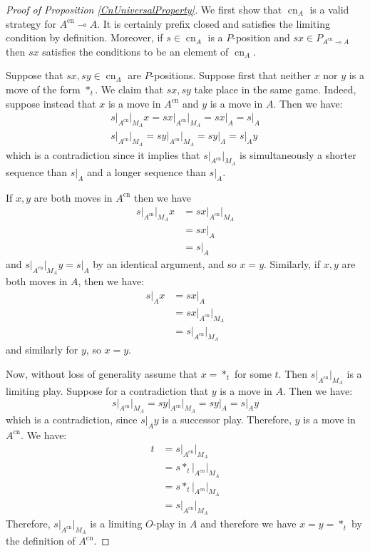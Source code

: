 \documentclass[11pt]{article} %
\theoremstyle{plain} %
\theoremstyle{definition} %
\theoremstyle{note}
\theoremstyle{exercisestyle}
\renewcommand{\implies}{\multimap}
\DeclareMathOperator{\cn}{cn}
\begin{document}
\begin{proof}[Proof of Proposition \ref{CnUniversalProperty}]
  We first show that $\cn_A$ is a valid strategy for $A^{\cn}\implies A$.  It is certainly prefix closed and satisfies the limiting condition by definition.  Moreover, if $s\in\cn_A$ is a $P$-position and $sx\in P_{A^{\cn}\implies A}$ then $sx$ satisfies the conditions to be an element of $\cn_A$.

  Suppose that $sx, sy\in \cn_A$ are $P$-positions.  Suppose first that neither $x$ nor $y$ is a move of the form $*_t$.  We claim that $sx,sy$ take place in the same game.  Indeed, suppose instead that $x$ is a move in $A^{\cn}$ and $y$ is a move in $A$.  Then we have:
  \begin{gather*}
    s\vert_{A^{\cn}}\vert_{M_A}x = sx\vert_{A^{\cn}}\vert_{M_A} = sx\vert_A = s\vert_A\\
    s\vert_{A^{\cn}}\vert_{M_A} = sy\vert_{A^{\cn}}\vert_{M_A} = sy\vert_A = s\vert_Ay
  \end{gather*}
  which is a contradiction since it implies that $s\vert_{A^{\cn}}\vert_{M_A}$ is simultaneously a shorter sequence than $s\vert_A$ and a longer sequence than $s\vert_A$.

  If $x,y$ are both moves in $A^{\cn}$ then we have
  \begin{align*}
    s\vert_{A^{\cn}}\vert_{M_A}x &= sx\vert_{A^{\cn}}\vert_{M_A} \\
    & = sx\vert_A\\
    & = s\vert_A
  \end{align*}
  and $s\vert_{A^{\cn}}\vert_{M_A}y=s\vert_A$ by an identical argument, and so $x=y$.  Similarly, if $x,y$ are both moves in $A$, then we have:
  \begin{align*}
    s\vert_Ax &= sx\vert_A \\
    &= sx\vert_{A^{\cn}}\vert_{M_A}\\
    &= s\vert_{A^{\cn}}\vert_{M_A}
  \end{align*}
  and similarly for $y$, so $x=y$.

  Now, without loss of generality assume that $x=*_t$ for some $t$.  Then $s\vert_{A^{\cn}}\vert_{M_A}$ is a limiting play.  Suppose for a contradiction that $y$ is a move in $A$.  Then we have:
  \[
    s\vert_{A^{\cn}}\vert_{M_A} = sy\vert_{A^{\cn}}\vert_{M_A}=sy\vert_A = s\vert_Ay
    \]
  which is a contradiction, since $s\vert_Ay$ is a successor play.  Therefore, $y$ is a move in $A^{\cn}$.  We have:
  \begin{align*}
    t &= s\vert_{A^{\cn}}\vert_{M_A}\\
    &= s*_t\vert_{A^{\cn}}\vert_{M_A}\\
    &= s*_t\vert_{A^{\cn}}\vert_{M_A}\\
    &= s\vert_{A^{\cn}}\vert_{M_A}
  \end{align*}
  Therefore, $s\vert_{A^{\cn}}\vert_{M_A}$ is a limiting $O$-play in $A$ and therefore we have $x=y=*_t$ by the definition of $A^{\cn}$.  


\end{proof}
\end{document}
